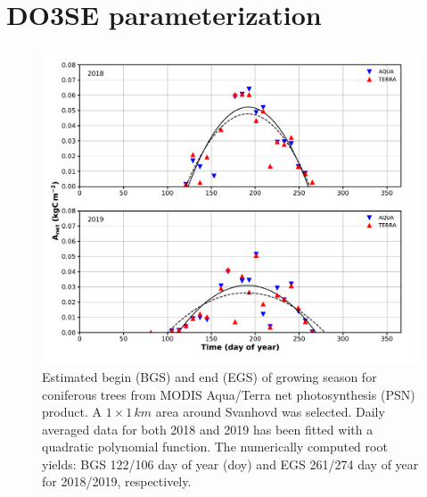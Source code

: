 \documentclass[bg, manuscript]{copernicus}
\begin{document}
\clearpage

\section{DO3SE parameterization}

\begin{figure}[t]
  \includegraphics[width=12cm]{figB1}
  \caption{Estimated begin (BGS) and end (EGS) of growing season for coniferous trees from MODIS Aqua/Terra net photosynthesis (PSN) product. A $1\times 1\,\unit{km}$ area around Svanhovd was selected. Daily averaged data for both 2018 and 2019 has been fitted with a quadratic polynomial function. The numerically computed root yields: BGS 122/106 day of year (doy) and EGS 261/274 day of year for 2018/2019, respectively.}
  \label{fig:modis_Psn}
\end{figure}
\end{document}
